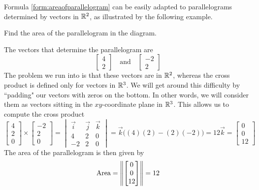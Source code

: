 \documentclass{ximera}
\begin{document}
     
     
     
    Formula \ref{form:areaofparallelogram} can be easily adapted to parallelograms determined by vectors in $\mathbb{R}^2$, as illustrated by the following example.
     
    \begin{example}\label{ex:areaofparallelogram}
    Find the area of the parallelogram in the diagram.
    \begin{center}
    \end{center}
    \begin{explanation}
    The vectors that determine the parallelogram are
    $$\begin{bmatrix}4\\2\end{bmatrix}\quad\text{and}\quad\begin{bmatrix}-2\\2\end{bmatrix}$$
    The problem we run into is that these vectors are in $\mathbb{R}^2$, whereas the cross product is defined only for vectors in $\mathbb{R}^3$.  We will get around this difficulty by ``padding" our vectors with zeros on the bottom.  In other words, we will consider them as vectors sitting in the $xy$-coordinate plane in $\mathbb{R}^3$.  This allows us to compute the cross product
    $$\begin{bmatrix}4\\2\\0\end{bmatrix}\times\begin{bmatrix}-2\\2\\0\end{bmatrix}=\begin{vmatrix}\vec{i}&\vec{j}&\vec{k}\\4&2&0\\-2&2&0\end{vmatrix}=\vec{k}\Big((4)(2)-(2)(-2)\Big)=12\vec{k}=\begin{bmatrix}0\\0\\12\end{bmatrix}$$
    The area of the parallelogram is then given by
    $$\mbox{Area}=\left\|\begin{bmatrix}0\\0\\12\end{bmatrix}\right\|=12$$
    \end{explanation}
    \end{example}
     
\end{document}
